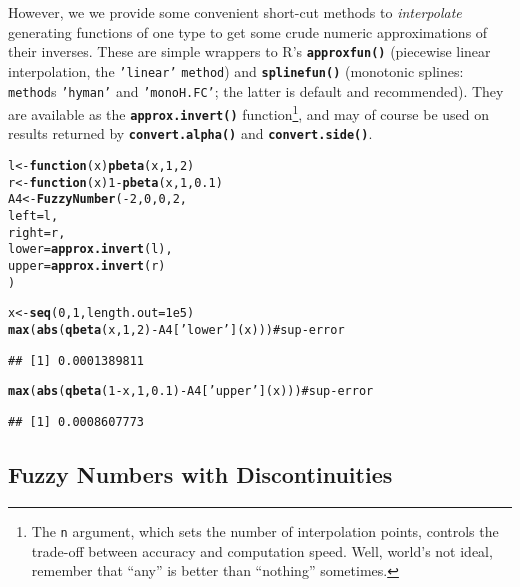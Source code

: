 \documentclass[11pt]{article}\usepackage{graphicx, color}
\makeatletter
\newcommand{\hlfunctioncall}[1]{\textcolor[rgb]{0.501960784313725,0,0.329411764705882}{\textbf{#1}}}%
\newcommand{\hlstring}[1]{\textcolor[rgb]{0.6,0.6,1}{#1}}%
\newcommand{\hlargument}[1]{\textcolor[rgb]{0.690196078431373,0.250980392156863,0.0196078431372549}{#1}}%
\newcommand{\hlcomment}[1]{\textcolor[rgb]{0.180392156862745,0.6,0.341176470588235}{#1}}%
\newenvironment{kframe}{%
 \def\at@end@of@kframe{}%
 \ifinner\ifhmode%
  \def\at@end@of@kframe{\end{minipage}}%
  \begin{minipage}{\columnwidth}%
 \fi\fi%
 \def\FrameCommand##1{\hskip\@totalleftmargin \hskip-\fboxsep
 \colorbox{shadecolor}{##1}\hskip-\fboxsep
     \hskip-\linewidth \hskip-\@totalleftmargin \hskip\columnwidth}%
 \MakeFramed {\advance\hsize-\width
   \@totalleftmargin\z@ \linewidth\hsize
   \@setminipage}}%
 {\par\unskip\endMakeFramed%
 \at@end@of@kframe}
\newenvironment{knitrout}{}{} %
\newcommand{\lang}[1]{\textsf{#1}\xspace}
\newcommand{\R}{\lang{R}}
\newcommand{\func}[1]{\texttt{\hlfunctioncall{#1}}}
\newcommand{\argument}[1]{\texttt{\hlargument{#1}}}
\newcommand{\str}[1]{\texttt{\hlstring{#1}}}
\makeatother
\begin{document}
However, we we provide some convenient short-cut methods
to \textit{interpolate} generating functions of one type
to get some crude numeric approximations of their inverses.
These are simple wrappers to \R's \func{approxfun()}
(piecewise linear interpolation,
the \str{'{}linear'{}} \argument{method})
and \func{splinefun()} (monotonic
splines: \argument{method}s \str{'{}hyman{}'}
and \str{'{}monoH.FC'{}}; the latter is
default and recommended).
They are available as the \func{approx.invert()}
function\footnote{The
\argument{n} argument, which sets the number of interpolation points,
controls the trade-off between accuracy and computation speed.
Well, world's not ideal, remember that ``any'' is better than ``nothing''
sometimes.}, and may
of course be used on results returned by
\func{convert.alpha()}
and \func{convert.side()}.


\begin{knitrout}\small
{}\color{fgcolor}\begin{kframe}
\begin{alltt}
l <- \hlfunctioncall{function}(x) \hlfunctioncall{pbeta}(x, 1, 2)
r <- \hlfunctioncall{function}(x) 1-\hlfunctioncall{pbeta}(x, 1, 0.1)
A4 <- \hlfunctioncall{FuzzyNumber}(-2, 0, 0, 2,
   left  = l,
   right = r,
   lower = \hlfunctioncall{approx.invert}(l),
   upper = \hlfunctioncall{approx.invert}(r)
)

x <- \hlfunctioncall{seq}(0,1,length.out=1e5)
\hlfunctioncall{max}(\hlfunctioncall{abs}(\hlfunctioncall{qbeta}(x, 1, 2) - A4[\hlstring{'lower'}](x)))     \hlcomment{# sup-error}
\end{alltt}
\begin{verbatim}
## [1] 0.0001389811
\end{verbatim}
\begin{alltt}
\hlfunctioncall{max}(\hlfunctioncall{abs}(\hlfunctioncall{qbeta}(1-x, 1, 0.1) - A4[\hlstring{'upper'}](x))) \hlcomment{# sup-error}
\end{alltt}
\begin{verbatim}
## [1] 0.0008607773
\end{verbatim}
\end{kframe}
\end{knitrout}




\subsection{Fuzzy Numbers with Discontinuities}\label{Sec:discontdef}
\end{document}
